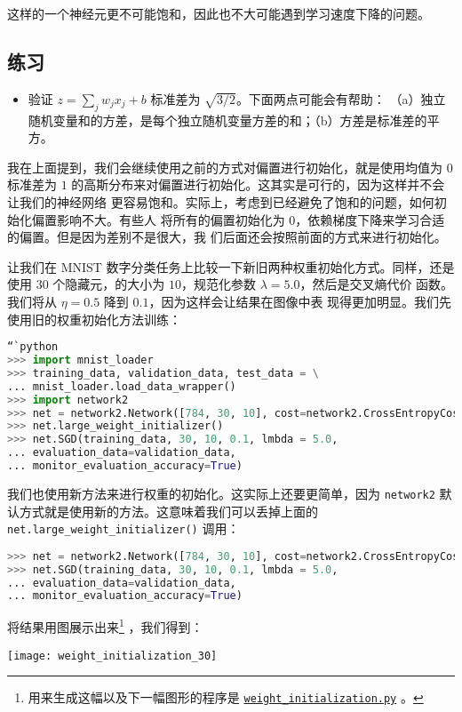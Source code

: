这样的一个神经元更不可能饱和，因此也不大可能遇到学习速度下降的问题。

\subsection*{练习}

\begin{itemize}
\item 验证 $z = \sum_j w_j x_j + b$ 标准差为 $\sqrt{3/2}$。下面两点可能会有帮助：
  （a）独立随机变量和的方差，是每个独立随机变量方差的和；（b）方差是标准差的平方。
\end{itemize}

我在上面提到，我们会继续使用之前的方式对偏置进行初始化，就是使用均值为 $0$ 标准差为
$1$ 的高斯分布来对偏置进行初始化。这其实是可行的，因为这样并不会让我们的神经网络
更容易饱和。实际上，考虑到已经避免了饱和的问题，如何初始化偏置影响不大。有些人
将所有的偏置初始化为 $0$，依赖梯度下降来学习合适的偏置。但是因为差别不是很大，我
们后面还会按照前面的方式来进行初始化。

让我们在 MNIST 数字分类任务上比较一下新旧两种权重初始化方式。同样，还是使用 $30$
个隐藏元，\minibatch 的大小为 $10$，规范化参数 $\lambda = 5.0$，然后是交叉熵代价
函数。我们将\learningrate{}从 $\eta=0.5$ 降到 $0.1$，因为这样会让结果在图像中表
现得更加明显。我们先使用旧的权重初始化方法训练：

\begin{lstlisting}[language=Python]
“`python
>>> import mnist_loader
>>> training_data, validation_data, test_data = \
... mnist_loader.load_data_wrapper()
>>> import network2
>>> net = network2.Network([784, 30, 10], cost=network2.CrossEntropyCost)
>>> net.large_weight_initializer()
>>> net.SGD(training_data, 30, 10, 0.1, lmbda = 5.0,
... evaluation_data=validation_data,
... monitor_evaluation_accuracy=True)
\end{lstlisting}

我们也使用新方法来进行权重的初始化。这实际上还要更简单，因为
\lstinline!network2! 默认方式就是使用新的方法。这意味着我们可以丢掉上面的
\lstinline!net.large_weight_initializer()! 调用：

\begin{lstlisting}[language=Python]
>>> net = network2.Network([784, 30, 10], cost=network2.CrossEntropyCost)
>>> net.SGD(training_data, 30, 10, 0.1, lmbda = 5.0,
... evaluation_data=validation_data,
... monitor_evaluation_accuracy=True)
\end{lstlisting}

将结果用图展示出来\footnote{用来生成这幅以及下一幅图形的程序是
  \href{https://github.com/mnielsen/neural-networks-and-deep-learning/blob/master/fig/weight_initialization.py}{\lstinline!weight_initialization.py!}
  。} ，我们得到：
\begin{center}
    \texttt{[image: weight\_initialization\_30]}
\end{center}

